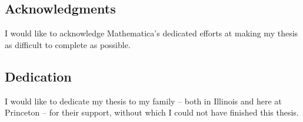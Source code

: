 \documentclass[a4paper,11pt]{article}
\begin{document}
 \newpage
{}
\subsection*{Acknowledgments}
\small
I would like to acknowledge Mathematica's dedicated efforts at making my thesis as difficult to complete as possible.

\newpage
{}
\subsection*{Dedication}
\small
I would like to dedicate my thesis to my family -- both in Illinois and here at Princeton -- for their support, without which I could not have finished this thesis.

\newpage
{}
\renewcommand*\contentsname{\LARGE CONTENTS}
\tableofcontents
\linespread{1.6}
\setlength{\parskip}{1.7mm}

\newpage
{}
\listoffigures
{}

\linespread{1.6} %

\small %
\end{document}
